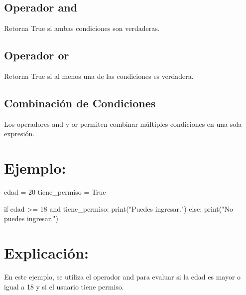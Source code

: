\documentclass[
  a4paper,
  onepage,
  openany]{scrreprt}
\newenvironment{Shaded}{\begin{snugshade}}{\end{snugshade}}
\newcommand{\BuiltInTok}[1]{\textcolor[rgb]{0.00,0.23,0.31}{#1}}
\newcommand{\ControlFlowTok}[1]{\textcolor[rgb]{0.00,0.23,0.31}{#1}}
\newcommand{\DecValTok}[1]{\textcolor[rgb]{0.68,0.00,0.00}{#1}}
\newcommand{\KeywordTok}[1]{\textcolor[rgb]{0.00,0.23,0.31}{#1}}
\newcommand{\NormalTok}[1]{\textcolor[rgb]{0.00,0.23,0.31}{#1}}
\newcommand{\OperatorTok}[1]{\textcolor[rgb]{0.37,0.37,0.37}{#1}}
\newcommand{\StringTok}[1]{\textcolor[rgb]{0.13,0.47,0.30}{#1}}
\newcommand{\VariableTok}[1]{\textcolor[rgb]{0.07,0.07,0.07}{#1}}
\begin{document}
\hypertarget{operador-and-1}{%
\subsection{Operador and}\label{operador-and-1}}

Retorna True si ambas condiciones son verdaderas.

\hypertarget{operador-or-1}{%
\subsection{Operador or}\label{operador-or-1}}

Retorna True si al menos una de las condiciones es verdadera.

\hypertarget{combinaciuxf3n-de-condiciones-1}{%
\subsection{Combinación de
Condiciones}\label{combinaciuxf3n-de-condiciones-1}}

Los operadores and y or permiten combinar múltiples condiciones en una
sola expresión.

\hypertarget{ejemplo-35}{%
\section{Ejemplo:}\label{ejemplo-35}}

\begin{Shaded}
\begin{Highlighting}[]
\NormalTok{edad }\OperatorTok{=} \DecValTok{20}
\NormalTok{tiene\_permiso }\OperatorTok{=} \VariableTok{True}

\ControlFlowTok{if}\NormalTok{ edad }\OperatorTok{\textgreater{}=} \DecValTok{18} \KeywordTok{and}\NormalTok{ tiene\_permiso:}
    \BuiltInTok{print}\NormalTok{(}\StringTok{"Puedes ingresar."}\NormalTok{)}
\ControlFlowTok{else}\NormalTok{:}
    \BuiltInTok{print}\NormalTok{(}\StringTok{"No puedes ingresar."}\NormalTok{)}
\end{Highlighting}
\end{Shaded}

\hypertarget{explicaciuxf3n-35}{%
\section{Explicación:}\label{explicaciuxf3n-35}}

En este ejemplo, se utiliza el operador and para evaluar si la edad es
mayor o igual a 18 y si el usuario tiene permiso.
\end{document}

